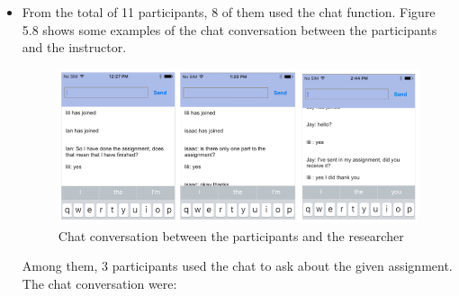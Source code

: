 \begin{itemize}
\item From the total of 11 participants, 8 of them used the chat function. Figure 5.8 shows some examples of the chat conversation between the participants and the instructor. 

\begin{figure}[!hbt]
\centering
\includegraphics[width=1 \textwidth]{p1ql5}
\caption{Chat conversation between the participants and the researcher}
\end{figure}

Among them, 3 participants used the chat to ask about the given assignment. The chat conversation were: 


\end{itemize}
